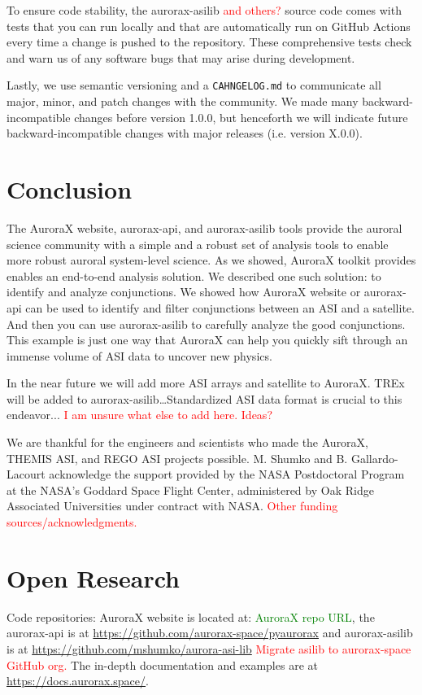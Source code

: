 \documentclass[draft]{agujournal2019}
\begin{document}
To ensure code stability, the aurorax-asilib \textcolor{red}{and others?} source code comes with tests that you can run locally and that are automatically run on GitHub Actions every time a change is pushed to the repository. These comprehensive tests check and warn us of any software bugs that may arise during development.

Lastly, we use semantic versioning and a \verb|CAHNGELOG.md| to communicate all major, minor, and patch changes with the community. We made many backward-incompatible changes before version 1.0.0, but henceforth we will indicate future backward-incompatible changes with major releases (i.e. version X.0.0). 

\section{Conclusion}
The AuroraX website, aurorax-api, and aurorax-asilib tools provide the auroral science community with a simple and a robust set of analysis tools to enable more robust auroral system-level science. As we showed, AuroraX toolkit provides enables an end-to-end analysis solution. We described one such solution: to identify and analyze conjunctions. We showed how AuroraX website or aurorax-api can be used to identify and filter conjunctions between an ASI and a satellite. And then you can use aurorax-asilib to carefully analyze the good conjunctions. This example is just one way that AuroraX can help you quickly sift through an immense volume of ASI data to uncover new physics.

In the near future we will add more ASI arrays and satellite to AuroraX. TREx will be added to aurorax-asilib\dots Standardized ASI data format is crucial to this endeavor...  \textcolor{red}{I am unsure what else to add here. Ideas?}


\acknowledgments
We are thankful for the engineers and scientists who made the AuroraX, THEMIS ASI, and REGO ASI projects possible. M. Shumko and B. Gallardo-Lacourt acknowledge the support provided by the NASA Postdoctoral Program at the NASA’s Goddard Space Flight Center, administered by Oak Ridge Associated Universities under contract with NASA. \textcolor{red}{Other funding sources/acknowledgments.}

\section*{Open Research}
\noindent Code repositories: AuroraX website is located at: \textcolor{green}{AuroraX repo URL}, the aurorax-api is at \url{https://github.com/aurorax-space/pyaurorax} and aurorax-asilib is at \url{https://github.com/mshumko/aurora-asi-lib} \textcolor{red}{Migrate asilib to aurorax-space GitHub org.} The in-depth documentation and examples are at \url{https://docs.aurorax.space/}.



\end{document}
